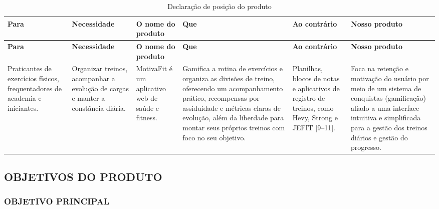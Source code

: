 \begingroup
\small
\setlength{\tabcolsep}{4pt}
\renewcommand{\arraystretch}{1.2}
\begin{longtable}{|>{\raggedright\arraybackslash}p{}|>{\raggedright\arraybackslash}p{}|>{\raggedright\arraybackslash}p{}|>{\raggedright\arraybackslash}p{}|>{\raggedright\arraybackslash}p{}|>{\raggedright\arraybackslash}p{}|}
\caption{Declaração de posição do produto}\\
\hline
\textbf{Para} & \textbf{Necessidade} & \textbf{O nome do produto} & \textbf{Que} & \textbf{Ao contrário} & \textbf{Nosso produto} \\ \hline
\endfirsthead
\textbf{Para} & \textbf{Necessidade} & \textbf{O nome do produto} & \textbf{Que} & \textbf{Ao contrário} & \textbf{Nosso produto} \\ \hline
\endhead
Praticantes de exercícios físicos, frequentadores de academia e iniciantes. & Organizar treinos, acompanhar a evolução de cargas e manter a constância diária. & MotivaFit é um aplicativo web de saúde e fitness. & Gamifica a rotina de exercícios e organiza as divisões de treino, oferecendo um acompanhamento prático, recompensas por assiduidade e métricas claras de evolução, além da liberdade para montar seus próprios treinos com foco no seu objetivo. & Planilhas, blocos de notas e aplicativos de registro de treinos, como Hevy, Strong e JEFIT [9--11]. & Foca na retenção e motivação do usuário por meio de um sistema de conquistas (gamificação) aliado a uma interface intuitiva e simplificada para a gestão dos treinos diários e gestão do progresso. \\ \hline
\end{longtable}
\endgroup

\subsection{OBJETIVOS DO PRODUTO}

\subsubsection{OBJETIVO PRINCIPAL}

